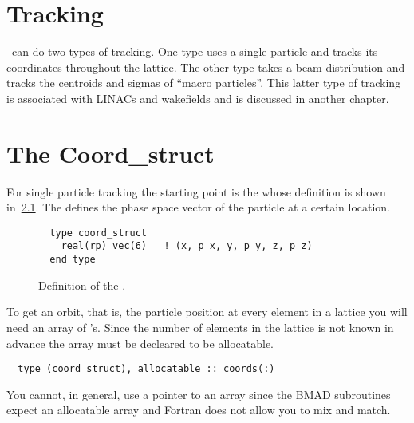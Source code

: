 \chapter{Tracking}

\bmad\ can do two types of tracking. One type uses a single particle 
and tracks its coordinates throughout the lattice. The other type
takes a beam distribution and tracks the centroids and sigmas of
``macro particles''.  This latter type of tracking is associated with
LINACs and wakefields and is discussed in another chapter.

\chapter{The Coord\_struct}

For single particle tracking the starting point is the
 whose definition is shown
in~\ref{f:coord_struct}. The  defines the phase
space vector of the particle at a certain location.

\begin{figure}[tb]
\centering
\small
\begin{verbatim}
  type coord_struct
    real(rp) vec(6)   ! (x, p_x, y, p_y, z, p_z)
  end type
\end{verbatim}
\caption{Definition of the .}
\label{f:coord_struct}
\end{figure}

To get an orbit, that is, the particle position at every element in a lattice
you will need an array of 's. Since
the number of elements in the lattice is not known in advance the
array must be decleared to be allocatable. 
\begin{verbatim}
  type (coord_struct), allocatable :: coords(:)
\end{verbatim}
You cannot, in general, use a pointer to an array since the BMAD
subroutines expect an allocatable array and Fortran does not allow you
to mix and match.

